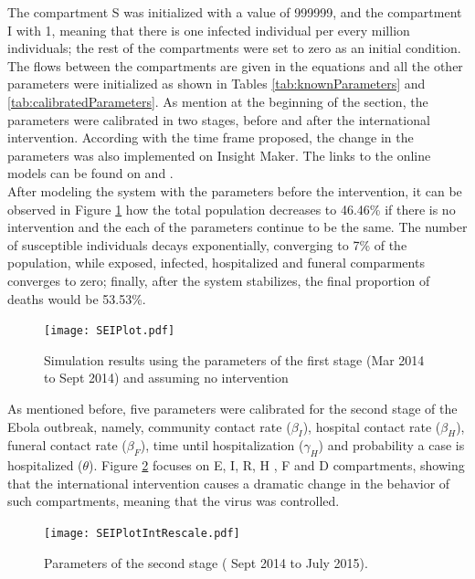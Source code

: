 \noindent The compartment S was initialized with a value of 999999, and the compartment I with 1, meaning that there is one infected individual per every million individuals; the rest of the compartments were set to zero as an initial condition. The flows between the compartments are given in the equations and all the other parameters were initialized as shown in Tables   \ref{tab:knownParameters} and \ref{tab:calibratedParameters}.  As mention at the beginning of the section, the parameters were calibrated in two stages, before and after the international intervention. According with the time frame proposed, the change in the parameters was also implemented on Insight Maker. The links to the online models can be found on \cite{IM_AI} and  \cite{IM_BI}.\\ 


%
\noindent After modeling the system with the parameters before the intervention, it can be observed in Figure \ref{fig:LB_IM_NoIn} how the total population decreases to 46.46\%  if there is no intervention and the each of the parameters continue to be the same. The number of susceptible individuals decays  exponentially, converging to 7\% of the population, while exposed, infected, hospitalized and funeral comparments converges to zero; finally, after the system stabilizes, the final proportion of deaths would be 53.53\%. \\

\begin{figure}[!h]
  \centering
  \texttt{[image: SEIPlot.pdf]}
  \caption{Simulation results using the parameters of the first stage (Mar 2014  to Sept 2014) and assuming no intervention}
\label{fig:LB_IM_NoIn} 
\end{figure}

\noindent As mentioned before, five parameters were calibrated for the second stage of the Ebola outbreak, namely, community contact rate ($\beta_I$), hospital contact rate ($\beta_H$), funeral contact rate ($\beta_F$), time until hospitalization ($\gamma_H$) and probability a case is hospitalized ($\theta$). Figure \ref{fig:LB_IM_In} focuses on E, I, R, H , F and D compartments, showing that the international intervention causes a dramatic change in the behavior of such compartments, meaning that the virus was controlled.

\begin{figure}[h!]
  \centering
  \texttt{[image: SEIPlotIntRescale.pdf]} 
\caption{ Parameters of the second stage ( Sept 2014 to July 2015).} 
\label{fig:LB_IM_In} 
\end{figure}






